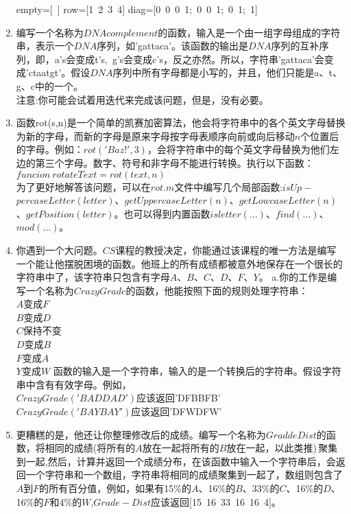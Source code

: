 \documentclass[UTF8]{ctexart}
\begin{document}
\begin{enumerate}
empty=[\ ]
row=[1\ 2\ 3\ 4]
diag=[0\ 0\ 0\ 1;\ 0\ 0\ 1;\ 0\ 1;\ 1]
\item 编写一个名称为$DNAcomplement$的函数，输入是一个由一组字母组成的字符串，表示一个$DNA$序列，如'gattaca'。该函数的输出是$DNA$序列的互补序列，即，a's会变成t's,\ g's会变成c's，反之亦然。所以，字符串'gattaca'会变成'ctaatgt'。假设$DNA$序列中所有字母都是小写的，并且，他们只能是a、t、g、c中的一个。\\
注意:你可能会试着用迭代来完成该问题，但是，没有必要。
\item 函数rot(s,n)是一个简单的凯赛加密算法，他会将字符串中的各个英文字母替换为新的字母，而新的字母是原来字母按字母表顺序向前或向后移动$n$个位置后的字母。例如：$rot('Baz!',3)$，会将字符串中的每个英文字母替换为他们左边的第三个字母。数字、符号和非字母不能进行转换。执行以下函数：\\
$funcion\ rotateText=rot(text,n)$\\
为了更好地解答该问题，可以在$rot.m$文件中编写几个局部函数:$isUp-$ $percaseLetter(letter)$、$getUppercaseLetter(n)$、$getLowcaseLetter(n)$、$getPosition(letter)$。也可以得到内置函数$isletter(\dots)$、$find(\dots)$、$mod(\dots)$。
\item 你遇到一个大问题。$CS$课程的教授决定，你能通过该课程的唯一方法是编写一个能让他摆脱困境的函数。他班上的所有成绩都被意外地保存在一个很长的字符串中了，该字符串只包含有字母$A$、$B$、$C$、$D$、$F$、$Y$。
a.你的工作是编写一个名称为$CrazyGrade$的函数，他能按照下面的规则处理字符串：\\
$A$变成$F$\\
$B$变成$D$\\
$C$保持不变\\
$D$变成$B$\\
$F$变成$A$\\
$Y$变成$W$
函数的输入是一个字符串，输入的是一个转换后的字符串。假设字符串中含有有效字母。例如，\\
$CrazyGrade('BADDAD')$应该返回'DFBBFB'\\
$CrazyGrade('BAYBAY')$应该返回'DFWDFW'
\item 更糟糕的是，他还让你整理修改后的成绩。编写一个名称为$GraddeDist$的函数，将相同的成绩(将所有的$A$放在一起将所有的$B$放在一起，以此类推)\,聚集到一起,然后，计算并返回一个成绩分布，在该函数中输入一个字符串后，会返回一个字符串和一个数组，字符串将相同的成绩聚集到一起了，数组则包含了$A$到$F$的所有百分值，例如，如果有15\%的$A$、16\%的$B$、33\%的$C$、16\%的$D$、16\%的$F$和4\%的$W$,$Grade-Dist$应该返回[15\ 16\ 33\ 16\ 16\ 4]。
\end{enumerate}
\end{document}
